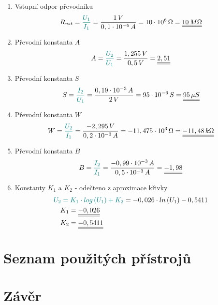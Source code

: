 \documentclass[a4paper, czech]{article}
\begin{document}
\begin{enumerate}
    \item Vstupní odpor převodníku
    \begin{multline*}
        R_{vst} = \textcolor{teal}{\frac{U_1}{I_1}} = \frac{1 \, V}{0,1 \cdot 10^{-6} \, A} = 10 \cdot 10^{6} \, \Omega = \underline{\underline{10 \, M \Omega}} \hfill
    \end{multline*}

    \item Převodní konstanta $A$
    \begin{multline*}
        A = \textcolor{teal}{\frac{U_2}{U_1}} = \frac{1,255 \, V}{0,5 \, V} = \underline{\underline{2,51}} \hfill
    \end{multline*}

    \item Převodní konstanta $S$
    \begin{multline*}
        S = \textcolor{teal}{\frac{I_2}{U_1}} = \frac{0,19 \cdot 10^{-3} \, A}{2 \, V} = 95 \cdot 10^{-6} \, S = \underline{\underline{95 \, \mu S}} \hfill
    \end{multline*}

    \item Převodní konstanta $W$
    \begin{multline*}
        W = \textcolor{teal}{\frac{U_2}{I_1}} = \frac{-2,295 \, V}{0,2 \cdot 10^{-3} \, A} = -11,475 \cdot 10^{3} \, \Omega = \underline{\underline{-11,48 \, k \Omega}} \hfill
    \end{multline*}

    \item Převodní konstanta $B$
    \begin{multline*}
        B = \textcolor{teal}{\frac{I_2}{I_1}} = \frac{-0,99 \cdot 10^{-3} \, A}{0,5 \cdot 10^{-3} \, A} = \underline{\underline{-1,98}} \hfill
    \end{multline*}

    \item Konstanty $K_1$ a $K_2$ - odečteno z aproximace křivky
    \begin{multline*}
        \textcolor{teal}{U_2 = K_1 \cdot log \left(U_1\right) + K_2} = -0,026 \cdot ln \left(U_1\right) - 0,5411 \hfill \\
        \ \ \ K_1 = \underline{\underline{-0,026}} \hfill \\
        \ \ \ K_2 = \underline{\underline{-0,5411}} \hfill
    \end{multline*}
\end{enumerate}

\section{Seznam použitých přístrojů}

\section{Závěr}
\end{document}
